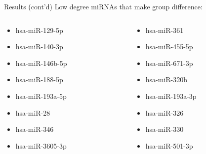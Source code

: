 \documentclass{beamer}
\begin{document}
\begin{frame}{Results (cont'd)}
	Low degree miRNAs that make group difference:
	\begin{columns}
		\begin{column}[t]{.48\textwidth}
			\begin{itemize}
				\item hsa-miR-129-5p
				\item hsa-miR-140-3p
				\item hsa-miR-146b-5p
				\item hsa-miR-188-5p
				\item hsa-miR-193a-5p
				\item hsa-miR-28
				\item hsa-miR-346
				\item hsa-miR-3605-3p
			\end{itemize}
		\end{column}
		\begin{column}[t]{.48\textwidth}
			\begin{itemize}
				\item hsa-miR-361
				\item hsa-miR-455-5p
				\item hsa-miR-671-3p
				\item hsa-miR-320b
				\item hsa-miR-193a-3p
				\item hsa-miR-326
				\item hsa-miR-330
				\item hsa-miR-501-3p
			\end{itemize}
		\end{column}
	\end{columns}
\end{frame}
\end{document}
